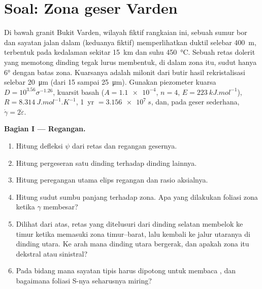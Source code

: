 \section{Soal: Zona geser Varden}

\begin{problem}
\label{pb:b3:deformation-mechanisms:1}
Di bawah granit Bukit Varden, wilayah fiktif rangkaian ini, sebuah
sumur bor dan sayatan jalan dalam (keduanya fiktif) memperlihatkan  duktil
selebar \qty{400}{m}, terbentuk pada kedalaman sekitar \qty{15}{km} dan suhu \qty{450}{\celsius}.
Sebuah retas dolerit yang memotong dinding tegak lurus membentuk, di dalam zona itu,
sudut hanya \ang{6} dengan batas zona. Kuarsanya adalah milonit
dari butir hasil rekristalisasi selebar \qty{20}{\micro m} (dari 15 sampai
\qty{25}{\micro m}). Gunakan piezometer kuarsa $D = 10^{3.56}\sigma^{-1.26}$,
 kuarsit basah ($A = \num{1.1e-4}$, $n = 4$, $E =
\qty{223}{kJ.mol^{-1}}$), $R = \qty{8.314}{J.mol^{-1}.K^{-1}}$, \qty{1}{yr} $=
\qty{3.156e7}{s}$, dan, pada geser sederhana, $\dot\gamma = 2\dot\varepsilon$.

\medskip\noindent\textbf{Bagian I --- Regangan.}
\begin{enumerate}
  \item Hitung defleksi $\psi$ dari retas dan regangan gesernya.
  \item Hitung pergeseran satu dinding terhadap dinding lainnya.
  \item Hitung peregangan utama elips regangan dan rasio
        aksialnya.
  \item Hitung sudut sumbu panjang terhadap zona. Apa yang
        dilakukan foliasi zona ketika $\gamma$ membesar?
  \item Dilihat dari atas, retas yang ditelusuri dari dinding selatan
        membelok ke timur ketika memasuki zona timur--barat, lalu kembali
        ke jalur utaranya di dinding utara. Ke arah mana dinding utara
        bergerak, dan apakah zona itu dekstral atau sinistral?
  \item Pada bidang mana sayatan tipis harus dipotong untuk membaca
        , dan bagaimana foliasi S-nya seharusnya miring?
\end{enumerate}


\end{problem}
